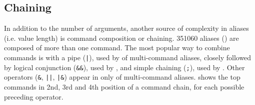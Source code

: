\subsection{Chaining} 

In addition to the number of arguments, another source of complexity in aliases (i.e. value length) is command composition or chaining.
\num{351060} aliases () are composed of more than one command.
The most popular way to combine commands is with a pipe (\verb!|!), used by  of multi-command aliases, closely followed by logical conjunction (\verb|&&|), used by , and simple chaining (\verb|;|), used by .
Other operators (\verb|&|, \verb!||!, \verb!|&!) appear in only  of multi-command aliases.
 shows the top commands in 2nd, 3rd and 4th position of a command chain, for each possible preceding operator.

